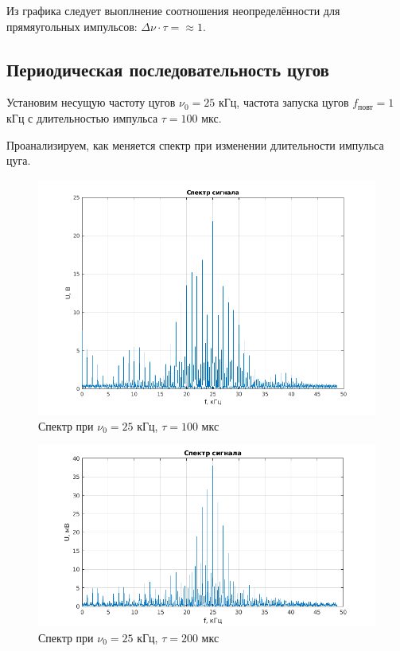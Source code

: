 \documentclass[a4paper, 12pt]{article}%
\begin{document}
Из графика следует выоплнение соотношения неопределённости для прямяугольных импульсов: $\Delta \nu \cdot \tau = \approx 1$.

\subsection{Периодическая последовательность цугов}

Установим несущую частоту цугов $\nu_0 = 25$ кГц, частота запуска цугов $f_{\text{повт}} = 1$ кГц с длительностью импульса $\tau = 100$ мкс.

Проанализируем, как меняется спектр при изменении длительности импульса цуга.

\begin{figure}[h!]
    \centering
    \includegraphics[width = 14 cm]{images/2_100_1.png}
    \caption{Спектр при $\nu_0 = 25$ кГц, $\tau = 100$ мкс}
\end{figure}

\begin{figure}[h!]
    \centering
    \includegraphics[width = 14 cm]{images/2_200_1.png}
    \caption{Спектр при $\nu_0 = 25$ кГц, $\tau = 200$ мкс}
\end{figure}
\end{document}
